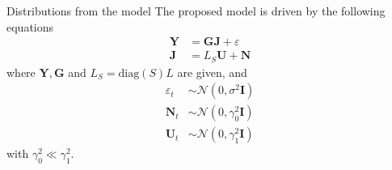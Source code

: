 \documentclass[progressbar=head]{beamer}
\newcommand{\set}[1]{ \left\{ #1 \right\} }
\newcommand{\ppar}[1]{ \left( #1 \right) }
\newcommand{\J}{\mathbf{J}}
\newcommand{\Y}{\mathbf{Y}}
\newcommand{\G}{\mathbf{G}}
\newcommand{\U}{\mathbf{U}}
\newcommand{\N}{\mathbf{N}}
\newcommand{\GAM}{\mathbf{\Gamma}}
\newcommand{\ga}{\pmb{\gamma}}
\newcommand{\id}{\mathbf{I}}
\newcommand{\norm}{\mathcal{N}}
\begin{document}
\begin{frame}{Distributions from the model}
The proposed model is driven by the following equations
\begin{align}
    \Y &= \G \J + \varepsilon \\
    \J &=  L_S \U + \N
\end{align}
where $\Y, \G$ and $L_S = \text{diag}\ppar{S} L$ are given, and
\begin{align}
    \varepsilon_t &\sim  \norm\ppar{0, \sigma^2 \id } \\
    \N_t &\sim  
    \norm\ppar{0, \gamma_0^2 \id } \\
    \U_t &\sim  
    \norm\ppar{0, \gamma_1^2 \id } 
\end{align}
with $\gamma_0^2 \ll \gamma_1^2$.
\end{frame}


%
\end{document}
